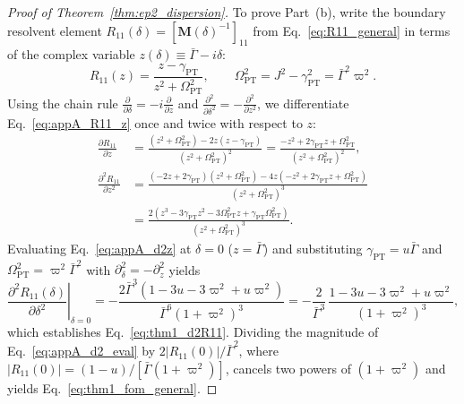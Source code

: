 \documentclass[11pt,letterpaper]{article}
\theoremstyle{definition}
\theoremstyle{remark}
\begin{document}
\begin{proof}[Proof of Theorem~\ref{thm:ep2_dispersion}]
To prove Part~(b), write the boundary resolvent element $R_{11}(\delta) = [\mathbf{M}(\delta)^{-1}]_{11}$ from Eq.~\eqref{eq:R11_general} in terms of the complex variable $z(\delta) \equiv \bar{\Gamma} - i\delta$:
\begin{equation}
R_{11}(z) = \frac{z - \gamma_{\mathrm{PT}}}{z^2 + \Omega_{\mathrm{PT}}^2}, \qquad \Omega_{\mathrm{PT}}^2 = J^2 - \gamma_{\mathrm{PT}}^2 = \bar{\Gamma}^2 \varpi^2.
\label{eq:appA_R11_z}
\end{equation}
Using the chain rule $\frac{\partial}{\partial \delta} = -i\frac{\partial}{\partial z}$ and $\frac{\partial^2}{\partial \delta^2} = -\frac{\partial^2}{\partial z^2}$, we differentiate Eq.~\eqref{eq:appA_R11_z} once and twice with respect to $z$:
\begin{align}
\frac{\partial R_{11}}{\partial z} &= \frac{(z^2 + \Omega_{\mathrm{PT}}^2) - 2z(z - \gamma_{\mathrm{PT}})}{(z^2 + \Omega_{\mathrm{PT}}^2)^2} = \frac{-z^2 + 2\gamma_{\mathrm{PT}}z + \Omega_{\mathrm{PT}}^2}{(z^2 + \Omega_{\mathrm{PT}}^2)^2}, \label{eq:appA_d1z}\\
\frac{\partial^2 R_{11}}{\partial z^2} &= \frac{(-2z + 2\gamma_{\mathrm{PT}})(z^2 + \Omega_{\mathrm{PT}}^2) - 4z(-z^2 + 2\gamma_{\mathrm{PT}}z + \Omega_{\mathrm{PT}}^2)}{(z^2 + \Omega_{\mathrm{PT}}^2)^3} \nonumber\\
&= \frac{2\left(z^3 - 3\gamma_{\mathrm{PT}}z^2 - 3\Omega_{\mathrm{PT}}^2 z + \gamma_{\mathrm{PT}}\Omega_{\mathrm{PT}}^2\right)}{\left(z^2 + \Omega_{\mathrm{PT}}^2\right)^3}. \label{eq:appA_d2z}
\end{align}
Evaluating Eq.~\eqref{eq:appA_d2z} at $\delta = 0$ ($z = \bar{\Gamma}$) and substituting $\gamma_{\mathrm{PT}} = u\bar{\Gamma}$ and $\Omega_{\mathrm{PT}}^2 = \varpi^2 \bar{\Gamma}^2$ with $\partial_\delta^2 = -\partial_z^2$ yields
\begin{equation}
\left.\frac{\partial^2 R_{11}(\delta)}{\partial \delta^2}\right|_{\delta=0} = -\frac{2\bar{\Gamma}^3\left(1 - 3u - 3\varpi^2 + u\varpi^2\right)}{\bar{\Gamma}^6\left(1 + \varpi^2\right)^3} = -\frac{2}{\bar{\Gamma}^3}\,\frac{1 - 3u - 3\varpi^2 + u\varpi^2}{\left(1 + \varpi^2\right)^3},
\label{eq:appA_d2_eval}
\end{equation}
which establishes Eq.~\eqref{eq:thm1_d2R11}. Dividing the magnitude of Eq.~\eqref{eq:appA_d2_eval} by $2|R_{11}(0)|/\bar{\Gamma}^2$, where $|R_{11}(0)| = (1 - u)/[\bar{\Gamma}(1 + \varpi^2)]$, cancels two powers of $(1 + \varpi^2)$ and yields Eq.~\eqref{eq:thm1_fom_general}.


\end{proof}
\end{document}
